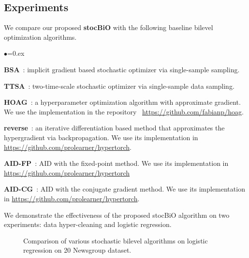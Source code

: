 \documentclass{osudissert96}
\begin{document}
\subsection*{Experiments}

We compare our proposed {\bf stocBiO} with the following baseline bilevel optimization algorithms. 
\begin{list}{$\bullet$}{\topsep=0.ex \leftmargin=0.12in  \itemsep =0.0in}
\item {\bf BSA}~\cite{ghadimi2018approximation}: implicit gradient based stochastic optimizer via single-sample sampling.
\item {\bf TTSA}~\cite{hong2020two}: two-time-scale stochastic optimizer via single-sample data sampling. 
\item {\bf HOAG}~\cite{pedregosa2016hyperparameter}: a hyperparameter optimization algorithm with approximate gradient. We use the implementation in the repository~ {\small\url{https://github.com/fabianp/hoag}}.  
\item {\bf reverse}~\cite{franceschi2017forward}: an iterative differentiation based method that approximates the hypergradient via backpropagation. We use its implementation in {\small \url{https://github.com/prolearner/hypertorch}}.  
 \item {\bf AID-FP}~\cite{grazzi2020iteration}: AID with the  fixed-point method. We use its implementation in {\small \url{https://github.com/prolearner/hypertorch}} 
\item  {\bf AID-CG}~\cite{grazzi2020iteration}: AID with the conjugate gradient method. We use its implementation in {\small \url{https://github.com/prolearner/hypertorch}}.  
 \end{list}
We demonstrate the effectiveness of the proposed stocBiO algorithm on two experiments: data hyper-cleaning and logistic regression.  
\begin{figure*}[ht]
	\centering  
	\vspace{-0.2cm}
	\caption{Comparison of various stochastic bilevel algorithms on logistic regression on 20 Newsgroup dataset.}\label{figure:newfigure}
	  \vspace{-0.3cm}
\end{figure*}
\end{document}
